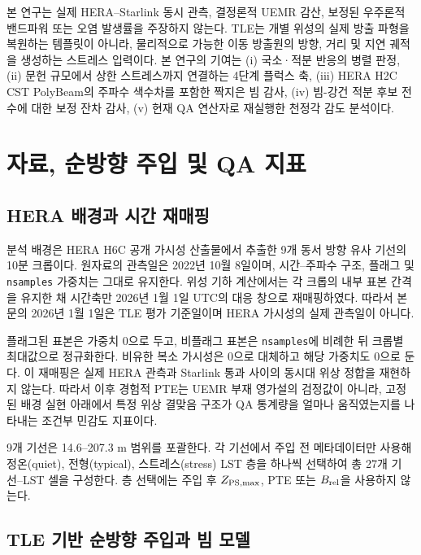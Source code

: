 \documentclass[final,5p,times]{elsarticle}
\newcommand{\NCells}{27}
\begin{document}
본 연구는 실제 HERA--Starlink 동시 관측, 결정론적 UEMR 감산,
보정된 우주론적 밴드파워 또는 오염 발생률을 주장하지 않는다.
TLE는 개별 위성의 실제 방출 파형을 복원하는 템플릿이 아니라,
물리적으로 가능한 이동 방출원의 방향, 거리 및 지연 궤적을 생성하는
스트레스 입력이다. 본 연구의 기여는 (i) 국소·적분 반응의 병렬
판정, (ii) 문헌 규모에서 상한 스트레스까지 연결하는 4단계 플럭스
축, (iii) HERA H2C CST PolyBeam의 주파수 색수차를 포함한 짝지은
빔 감사, (iv) 빔-강건 적분 후보 전수에 대한 보정 잔차 감사,
(v) 현재 QA 연산자로 재실행한 천정각 감도 분석이다.

\section{자료, 순방향 주입 및 QA 지표}
\label{sec:methods}

\subsection{HERA 배경과 시간 재매핑}
\label{sec:background}

분석 배경은 HERA H6C 공개 가시성 산출물에서 추출한 9개 동서 방향
유사 기선의 10분 크롭이다. 원자료의 관측일은 2022년 10월 8일이며,
시간--주파수 구조, 플래그 및 \texttt{nsamples} 가중치는 그대로
유지한다. 위성 기하 계산에서는 각 크롭의 내부 표본 간격을 유지한
채 시간축만 2026년 1월 1일 UTC의 대응 창으로 재매핑하였다. 따라서
본문의 2026년 1월 1일은 TLE 평가 기준일이며 HERA 가시성의 실제
관측일이 아니다.

플래그된 표본은 가중치 0으로 두고, 비플래그 표본은
\texttt{nsamples}에 비례한 뒤 크롭별 최대값으로 정규화한다. 비유한
복소 가시성은 0으로 대체하고 해당 가중치도 0으로 둔다. 이 재매핑은
실제 HERA 관측과 Starlink 통과 사이의 동시대 위상 정합을 재현하지
않는다. 따라서 이후 경험적 PTE는 UEMR 부재 영가설의 검정값이 아니라,
고정된 배경 실현 아래에서 특정 위상 결맞음 구조가 QA 통계량을 얼마나
움직였는지를 나타내는 조건부 민감도 지표이다.

9개 기선은 14.6--207.3 m 범위를 포괄한다. 각 기선에서 주입 전
메타데이터만 사용해 정온(quiet), 전형(typical), 스트레스(stress)
LST 층을 하나씩 선택하여 총 \NCells{}개 기선--LST 셀을 구성한다.
층 선택에는 주입 후 $Z_{\rm PS,max}$, PTE 또는 $B_{\rm rel}$을
사용하지 않는다.

\subsection{TLE 기반 순방향 주입과 빔 모델}
\label{sec:injection}
\end{document}
